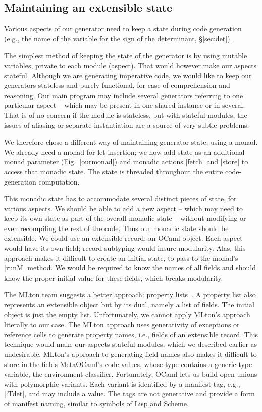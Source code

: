 \documentclass{elsart}
\begin{document}
\subsection{Maintaining an extensible state}\label{ssec:state}

Various aspects of our generator need to keep a state during
code generation (e.g., the name of the variable for the sign of
the determinant, \S\ref{sec:det}).

The simplest method of keeping the state of the generator is by using
mutable variables, private to each module (aspect). That would however
make our aspects stateful. Although we are generating imperative code,
we would like to keep our generators stateless and purely functional,
for ease of comprehension and reasoning.  Our main program may include
several generators referring to one particular aspect -- which may be
present in one shared instance or in several. That is of no concern if
the module is stateless, but with stateful modules, the issues of
aliasing or separate instantiation are a source of very subtle
problems.

We therefore chose a different way of maintaining generator state,
using a monad. We already need a monad for let-insertion; we now add state as
an additional monad parameter (Fig.~\ref{ourmonad}) and monadic
actions |fetch| and |store| to access that monadic state. The state is
threaded throughout the entire code-generation computation. 

This monadic state has to accommodate several distinct pieces of state, for
various aspects. We should be able to add a new aspect -- which may need
to keep its own state as part of the overall monadic state -- without
modifying or even recompiling the rest of the code. Thus our monadic
state should be extensible. We could use an extensible
record: an OCaml object. Each aspect would have its own field; record
subtyping would insure modularity. Alas, this approach makes it
difficult to create an initial state, to pass to the monad's |runM|
method. We would be required to know the names of all fields and should know
the proper initial value for these fields, which breaks modularity.

The MLton team suggests a better approach: property 
lists~\cite{mlton-proplist}.  A property list also represents an
extensible object but by its dual, namely a list of fields.  The
initial object is just the empty list.  Unfortunately, we cannot apply
MLton's approach literally to our case. The MLton
approach uses generativity of exceptions or reference cells to
generate property names, i.e., fields of an extensible record. This
technique would make our aspects stateful modules, which we described
earlier as undesirable. MLton's approach to generating field
names also makes it difficult to store in the fields MetaOCaml's code
values, whose type contains a generic type variable, the environment
classifier. 
Fortunately, OCaml lets us build open unions with
polymorphic variants. Each variant is identified by a manifest tag,
e.g., |`Tdet|, and may include a value. The tags are not generative and
provide a form of manifest naming, similar to symbols of
Lisp and Scheme.
\end{document}
